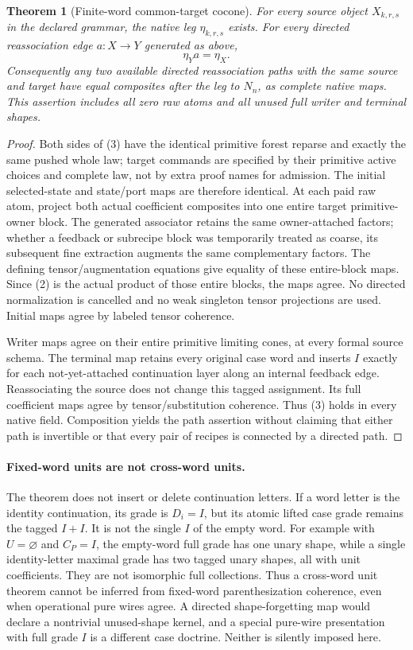 \documentclass[11pt]{article}\usepackage{amsmath,amssymb,amsthm,geometry}\geometry{margin=1in}\newtheorem{definition}{Definition}\newtheorem{theorem}[definition]{Theorem}
\begin{document}
\begin{theorem}[Finite-word common-target cocone]
For every source object $X_{k,r,s}$ in the declared grammar, the native leg $\eta_{k,r,s}$ exists. For every directed reassociation edge $a:X\to Y$ generated as above,
\[
                              \eta_Ya=\eta_X.        \tag{3}
\]
Consequently any two available directed reassociation paths with the same source and target have equal composites after the leg to $N_n$, as complete native maps. This assertion includes all zero raw atoms and all unused full writer and terminal shapes.
\end{theorem}
\begin{proof}
Both sides of (3) have the identical primitive forest reparse and exactly the same pushed whole law; target commands are specified by their primitive active choices and complete law, not by extra proof names for admission. The initial selected-state and state/port maps are therefore identical. At each paid raw atom, project both actual coefficient composites into one entire target primitive-owner block. The generated associator retains the same owner-attached factors; whether a feedback or subrecipe block was temporarily treated as coarse, its subsequent fine extraction augments the same complementary factors. The defining tensor/augmentation equations give equality of these entire-block maps. Since (2) is the actual product of those entire blocks, the maps agree. No directed normalization is cancelled and no weak singleton tensor projections are used. Initial maps agree by labeled tensor coherence.

Writer maps agree on their entire primitive limiting cones, at every formal source schema. The terminal map retains every original case word and inserts $I$ exactly for each not-yet-attached continuation layer along an internal feedback edge. Reassociating the source does not change this tagged assignment. Its full coefficient maps agree by tensor/substitution coherence. Thus (3) holds in every native field. Composition yields the path assertion without claiming that either path is invertible or that every pair of recipes is connected by a directed path.
\end{proof}

\paragraph{Fixed-word units are not cross-word units.}
The theorem does not insert or delete continuation letters. If a word letter is the identity continuation, its grade is $D_i=I$, but its atomic lifted case grade remains the tagged $I+I$. It is not the single $I$ of the empty word. For example with $U=\varnothing$ and $C_P=I$, the empty-word full grade has one unary shape, while a single identity-letter maximal grade has two tagged unary shapes, all with unit coefficients. They are not isomorphic full collections. Thus a cross-word unit theorem cannot be inferred from fixed-word parenthesization coherence, even when operational pure wires agree. A directed shape-forgetting map would declare a nontrivial unused-shape kernel, and a special pure-wire presentation with full grade $I$ is a different case doctrine. Neither is silently imposed here.
\end{document}

